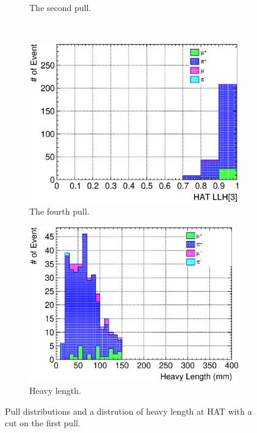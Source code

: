 \begin{figure}
\begin{subfigure}{\dbfigwid\textwidth}
       \caption{The second pull.}
       \label{subfig:sppi-pulls-2-res-bot}
  \end{subfigure}
  \\
  \begin{subfigure}{\dbfigwid\textwidth}
       \includegraphics[width=\textwidth]{figures/sel/sspi_BOT_hat_pid3_stack_al6_zoom.eps}
       \caption{The fourth pull.}
       \label{subfig:sppi-pulls-4-res-bot}
  \end{subfigure}
  \begin{subfigure}{\dbfigwid\textwidth}
       \includegraphics[width=\textwidth]{figures/sel/sspi_BOT_trk_heavylen_stack_al6_zoom.eps}
       \caption{Heavy length.}
       \label{subfig:sppi-heavylen-res-bot}
  \end{subfigure}
  \caption{Pull distributions and a distrution of heavy length at HAT with a cut on the first pull.}
  \label{fig:app-pulls-res-bot}
\end{figure}